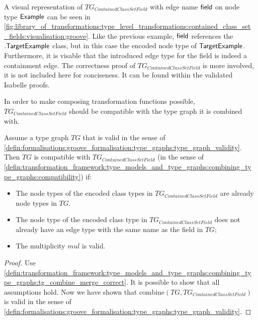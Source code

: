 A visual representation of $TG_{ContainedClassSetField}$ with edge name $\mathsf{field}$ on node type $\mathsf{Example}$ can be seen in \cref{fig:library_of_transformations:type_level_transformations:contained_class_set_fields:visualisation:groove}. Like the previous example, $\mathsf{field}$ references the $.\mathsf{TargetExample}$ class, but in this case the encoded node type of $\mathsf{TargetExample}$. Furthermore, it is visable that the introduced edge type for the field is indeed a containment edge. The correctness proof of $TG_{ContainedClassSetField}$ is more involved, it is not included here for conciseness. It can be found within the validated Isabelle proofs.

In order to make composing transformation functions possible, $TG_{ContainedClassSetField}$ should be compatible with the type graph it is combined with.

\begin{thm}
\label{defin:library_of_transformations:type_level_transformations:contained_class_set_fields:tg_contained_class_set_field_as_edge_type_combine_correct}
Assume a type graph $TG$ that is valid in the sense of \cref{defin:formalisations:groove_formalisation:type_graphs:type_graph_validity}. Then $TG$ is compatible with $TG_{ContainedClassSetField}$ (in the sense of \cref{defin:transformation_framework:type_models_and_type_graphs:combining_type_graphs:compatibility}) if:
\begin{itemize}
    \item The node types of the encoded class types in $TG_{ContainedClassSetField}$ are already node types in $TG$.
    \item The node type of the encoded class type in $TG_{ContainedClassSetField}$ does not already have an edge type with the same name as the field in $TG$;
    \item The multiplicity $mul$ is valid.
\end{itemize}
\end{thm}

\begin{proof}
Use \cref{defin:transformation_framework:type_models_and_type_graphs:combining_type_graphs:tg_combine_merge_correct}. It is possible to show that all assumptions hold. Now we have shown that $\mathrm{combine}(TG, TG_{ContainedClassSetField})$ is valid in the sense of \cref{defin:formalisations:groove_formalisation:type_graphs:type_graph_validity}.
\end{proof}

